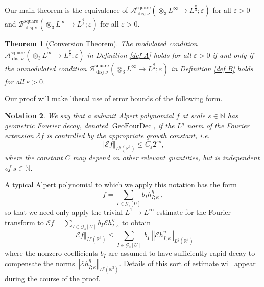 \documentclass{amsart}%
\newtheorem{theorem}{Theorem}
\theoremstyle{plain}
\newtheorem{notation}[theorem]{Notation}
\numberwithin{equation}{section}
\begin{document}
Our main theorem is the equivalence of $\mathcal{A}_{\operatorname*{disj}\nu
}^{\operatorname*{square}}\left(  \otimes_{3}L^{\infty}\rightarrow L^{\frac
{q}{3}};\varepsilon\right)  $ for all $\varepsilon>0$ and $\mathcal{B}%
_{\operatorname*{disj}\nu}^{\operatorname*{square}}\left(  \otimes
_{3}L^{\infty}\rightarrow L^{\frac{q}{3}};\varepsilon\right)  $ for all
$\varepsilon>0$.

\begin{theorem}
[Conversion Theorem]The modulated condition $\mathcal{A}_{\operatorname*{disj}%
\nu}^{\operatorname*{square}}\left(  \otimes_{3}L^{\infty}\rightarrow
L^{\frac{q}{3}};\varepsilon\right)  $ in Definition \ref{def A} holds for all
$\varepsilon>0$ \emph{if and only if} the unmodulated condition $\mathcal{B}%
_{\operatorname*{disj}\nu}^{\operatorname*{square}}\left(  \otimes
_{3}L^{\infty}\rightarrow L^{\frac{q}{3}};\varepsilon\right)  $ in Definition
\ref{def B} holds for all $\varepsilon>0$.
\end{theorem}

Our proof will make liberal use of error bounds of the following form.

\begin{notation}
\label{geo Four dec}We say that a subunit Alpert polynomial $f$ at scale
$s\in\mathbb{N}$ has \emph{geometric Fourier decay}, denoted
$\operatorname*{GeoFourDec}$, if the $L^{q}$ norm of the Fourier extension
$\mathcal{E}f$ is controlled by the appropriate growth constant, i.e.%
\[
\left\Vert \mathcal{E}f\right\Vert _{L^{q}\left(  \mathbb{R}^{3}\right)  }\leq
C_{\varepsilon}2^{\varepsilon s},
\]
where the constant $C$ may depend on other relevant quantities, but is
independent of $s\in\mathbb{N}$.
\end{notation}

A typical Alpert polynomial to which we apply this notation has the form%
\[
f=\sum_{I\in\mathcal{G}_{s}\left[  U\right]  }b_{I}h_{I;\kappa}^{\eta}\ ,
\]
so that we need only apply the trivial $L^{1}\rightarrow L^{\infty}$ estimate
for the Fourier transform to $\mathcal{E}f=\sum_{I\in\mathcal{G}_{s}\left[
U\right]  }b_{I}\mathcal{E}h_{I;\kappa}^{\eta}$ to obtain%
\[
\left\Vert \mathcal{E}f\right\Vert _{L^{q}\left(  \mathbb{R}^{3}\right)  }%
\leq\sum_{I\in\mathcal{G}_{s}\left[  U\right]  }\left\vert b_{I}\right\vert
\left\Vert \mathcal{E}h_{I;\kappa}^{\eta}\right\Vert _{L^{q}\left(
\mathbb{R}^{3}\right)  }%
\]
where the nonzero coefficients $b_{I}$ are assumed to have sufficiently rapid
decay to compensate the norms $\left\Vert \mathcal{E}h_{I;\kappa}^{\eta
}\right\Vert _{L^{q}\left(  \mathbb{R}^{3}\right)  }$. Details of this sort of
estimate will appear during the course of the proof.
\end{document}
